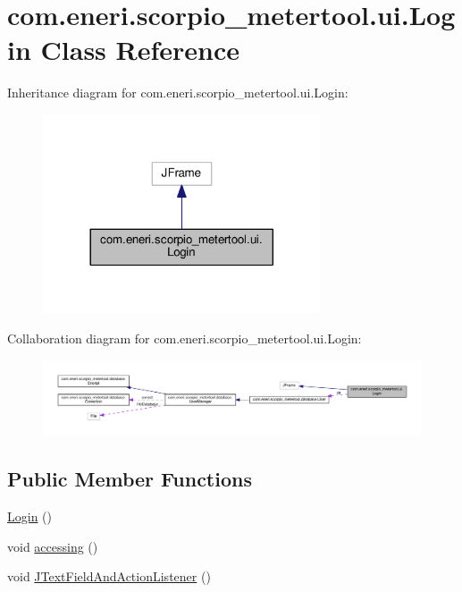 \hypertarget{classcom_1_1eneri_1_1scorpio__metertool_1_1ui_1_1_login}{}\section{com.\+eneri.\+scorpio\+\_\+metertool.\+ui.\+Login Class Reference}
\label{classcom_1_1eneri_1_1scorpio__metertool_1_1ui_1_1_login}


Inheritance diagram for com.\+eneri.\+scorpio\+\_\+metertool.\+ui.\+Login\+:
\nopagebreak
\begin{figure}[H]
\begin{center}
\leavevmode
\includegraphics[width=233pt]{classcom_1_1eneri_1_1scorpio__metertool_1_1ui_1_1_login__inherit__graph}
\end{center}
\end{figure}


Collaboration diagram for com.\+eneri.\+scorpio\+\_\+metertool.\+ui.\+Login\+:
\nopagebreak
\begin{figure}[H]
\begin{center}
\leavevmode
\includegraphics[width=350pt]{classcom_1_1eneri_1_1scorpio__metertool_1_1ui_1_1_login__coll__graph}
\end{center}
\end{figure}
\subsection*{Public Member Functions}
\begin{DoxyCompactItemize}
\item 
\hyperlink{classcom_1_1eneri_1_1scorpio__metertool_1_1ui_1_1_login_aa7bb03bfd5981bdfc35345b9b585658c}{Login} ()
\item 
void \hyperlink{classcom_1_1eneri_1_1scorpio__metertool_1_1ui_1_1_login_a886a4b5308a041b993b14742d2e401f1}{accessing} ()
\item 
void \hyperlink{classcom_1_1eneri_1_1scorpio__metertool_1_1ui_1_1_login_ac370264fc5a9cf40f743ac5342a2b7fb}{J\+Text\+Field\+And\+Action\+Listener} ()
\end{DoxyCompactItemize}



